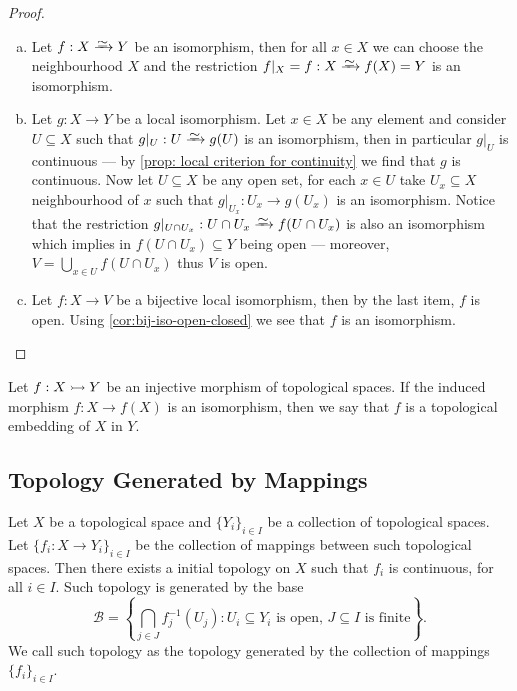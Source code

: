 \begin{proof}
    \begin{enumerate}[(a)]\setlength\itemsep{0em}
        \item Let \(f: X \isoto Y\) be an isomorphism, then for all \(x \in X\) we can
              choose the neighbourhood \(X\) and the restriction \(f|_X = f: X \isoto f(X) =
              Y\) is an isomorphism.
        \item Let \(g: X \to Y\) be a local isomorphism. Let \(x \in X\) be any element
              and consider \(U \subseteq X\) such that \(g|_U: U \isoto g(U)\) is an
              isomorphism, then in particular \(g|_U\) is continuous --- by \cref{prop:
                  local criterion for continuity} we find that \(g\) is continuous. Now let \(U
              \subseteq X\) be any open set, for each \(x \in U\) take \(U_x \subseteq X\)
              neighbourhood of \(x\) such that \(g|_{U_x}: U_x \to g(U_x)\) is an
              isomorphism. Notice that the restriction \(g|_{U \cap U_x}: U \cap U_x \isoto
              f(U \cap U_x)\) is also an isomorphism which implies in \(f(U \cap U_x)
              \subseteq Y\) being open --- moreover, \(V = \bigcup_{x \in U} f(U \cap
              U_{x})\) thus \(V\) is open.
        \item Let \(f: X \to V\) be a bijective local isomorphism, then by the last item,
              \(f\) is open. Using \cref{cor:bij-iso-open-closed} we see that \(f\) is an
              isomorphism.
    \end{enumerate}
\end{proof}

\begin{definition}[Embedding]\label{def:top-embedding}
    Let \(f: X \rightarrowtail Y\) be an injective morphism of topological spaces. If the
    induced morphism \(f: X \to f(X)\) is an isomorphism, then we say that \(f\) is a
    topological embedding of \(X\) in \(Y\).
\end{definition}

\subsection{Topology Generated by Mappings}

\begin{proposition}
    \label{prop: top generated by collection of maps}
    Let \(X\) be a topological space and \(\{Y_i\}_{i \in I}\) be a collection of
    topological spaces. Let \(\{f_i : X \to Y_i\}_{i \in I}\) be the collection of
    mappings between such topological spaces. Then there exists a initial
    topology on \(X\) such that \(f_i\) is continuous, for all \(i \in I\). Such
    topology is generated by the base
    \[
        \mathcal B = \left\{ \bigcap_{j \in J} f_j^{-1}(U_j) : U_i \subseteq Y_i
        \text{ is open, } J \subseteq I \text{ is finite}\right\}.
    \]
    We call such topology as the topology generated by the collection of mappings
    \(\{f_i\}_{i \in I}\).
\end{proposition}

